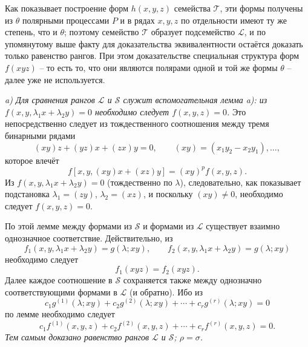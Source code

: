 \documentclass[11pt]{article}
\begin{document}
Как показывает построение форм $h(x,y,z)$ семейства $\mathcal T$, эти формы получены из $\theta$ полярными процессами $P$ и в рядах $x,y,z$ по отдельности имеют ту же степень, что и $\theta$; поэтому семейство $\mathcal T$ образует подсемейство $\mathcal L$, и по упомянутому выше факту для доказательства эквивалентности остаётся доказать только равенство рангов. При этом доказательстве специальная структура форм $f(xyz)$ -- то есть то, что они являются полярами одной и той же формы $\theta$ -- далее уже не используется.

\emph{a) Для сравнения рангов $\mathcal L$ и $\mathcal S$ служит вспомогательная лемма a): из $f(x,y,\lambda_1x+\lambda_2y)=0$ необходимо следует $f(x,y,z)=0$.} Это непосредственно следует из тождественного соотношения между тремя бинарными рядами
\[
  (xy)z+(yz)x+(zx)y=0,
  \qquad (xy)=(x_1y_2-x_2y_1),\ldots,
\]
которое влечёт
\[
  f[x,y,(xy)x+(xz)y]=(xy)^p f(x,y,z).
\]
Из $f(x,y,\lambda_1x+\lambda_2y)=0$ (тождественно по $\lambda$), следовательно, как показывает подстановка $\lambda_1=(zy)$, $\lambda_2=(xz)$, и поскольку $(xy)\ne0$, необходимо следует $f(x,y,z)=0$.

По этой лемме между формами из $\mathcal S$ и формами из $\mathcal L$ существует взаимно однозначное соответствие. Действительно, из
\[
  f_1(x,y,\lambda_1x+\lambda_2y)=g(\lambda;xy),\qquad
  f_2(x,y,\lambda_1x+\lambda_2y)=g(\lambda;xy)
\]
необходимо следует
\[
  f_1(xyz)=f_2(xyz).
\]
Далее каждое соотношение в $\mathcal S$ сохраняется также между однозначно соответствующими формами в $\mathcal L$ (и обратно). Ибо из
\[
  c_1g^{(1)}(\lambda;xy)+c_2g^{(2)}(\lambda;xy)+\cdots+c_rg^{(r)}(\lambda;xy)=0
\]
по лемме необходимо следует
\[
  c_1f^{(1)}(x,y,z)+c_2f^{(2)}(x,y,z)+\cdots+c_rf^{(r)}(x,y,z)=0.
\]
\emph{Тем самым доказано равенство рангов $\mathcal L$ и $\mathcal S$; $\rho=\sigma$.}
\end{document}
